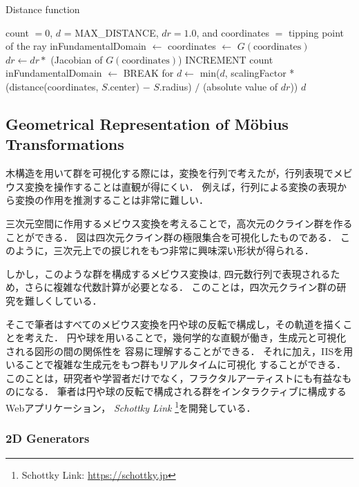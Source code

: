 \begin{algorithm}
 \caption{Distance function}
 \label{iis3d}
 \begin{algorithmic}
  \REQUIRE count $= 0$, $d$ = MAX\_DISTANCE, $dr = 1.0$, and coordinates $=$ tipping
  point of the ray
  \STATE inFundamentalDomain $\leftarrow$ \TRUE
  \STATE coordinates $\leftarrow$ $G(\text{coordinates})$
  \STATE $dr \leftarrow dr * $ (Jacobian of $G(\text{coordinates})$)
  \STATE INCREMENT count
  \STATE inFundamentalDomain $\leftarrow$ \FALSE
  \ENDIF
  \ENDFOR
  \STATE BREAK for
  \ENDIF
  \ENDFOR
  \STATE $d \leftarrow$ min($d$, scalingFactor * (distance(coordinates, $S$.center) $-$
  $S$.radius) $/$ (absolute value of $dr$))
  \ENDFOR
  \RETURN $d$
 \end{algorithmic}
\end{algorithm}

\subsection{Geometrical Representation of M\"obius Transformations}

木構造を用いて群を可視化する際には，変換を行列で考えたが，行列表現でメビ
ウス変換を操作することは直観が得にくい．
例えば，行列による変換の表現から変換の作用を推測することは非常に難しい．

三次元空間に作用するメビウス変換を考えることで，高次元のクライン群を作ることができる．
図は四次元クライン群の極限集合を可視化したものである．
このように，三次元上での捩じれをもつ非常に興味深い形状が得られる．

しかし，このような群を構成するメビウス変換は,
四元数行列で表現されるため，さらに複雑な代数計算が必要となる．
このことは，四次元クライン群の研究を難しくしている．

そこで筆者はすべてのメビウス変換を円や球の反転で構成し，その軌道を描くことを考えた．
円や球を用いることで，幾何学的な直観が働き，生成元と可視化される図形の間の関係性を
容易に理解することができる．
それに加え，IISを用いることで複雑な生成元をもつ群もリアルタイムに可視化
することができる．
このことは，研究者や学習者だけでなく，フラクタルアーティストにも有益なも
のになる．
筆者は円や球の反転で構成される群をインタラクティブに構成するWebアプリケーション，
{\it Schottky Link} \footnote{Schottky Link:
\url{https://schottky.jp}}を開発している．

\subsubsection{2D Generators}

